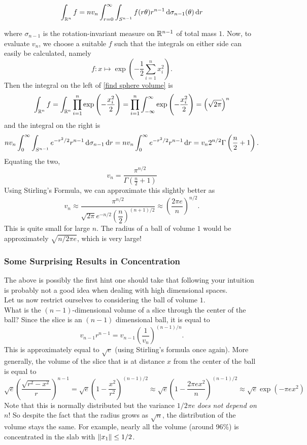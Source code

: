 \begin{equation}
\label{find sphere volume}
    \int_{\mathbb{R}^n} f = nv_n \int_{r=0}^\infty \int_{S^{n-1}} f(r\theta) r^{n-1} \operatorname{d}\!{\sigma}_{n-1}(\theta) \operatorname{d}\!{r}
\end{equation}

where $\sigma_{n-1}$ is the rotation-invariant measure on $\mathbb{R}^{n-1}$ of total mass $1$. Now, to evaluate $v_n$, we choose a suitable $f$ such that the integrals on either side can easily be calculated, namely
\[f: x\mapsto \exp\left(-\frac{1}{2}\sum_{i=1}^n x_i^2\right).\]
Then the integral on the left of \ref{find sphere volume} is
\[
\int_{\mathbb{R}^n}f = \int_{\mathbb{R}^n}\prod_{i=1}^n \exp\left(-\frac{x_i^2}{2}\right) = \prod_{i=1}^n \int_{-\infty}^\infty \exp\left(-\frac{x_i^2}{2}\right) = \left(\sqrt{2\pi}\right)^n
\]
and the integral on the right is
\[
nv_n\int_0^\infty \int_{S^{n-1}} e^{-r^2/2}r^{n-1}\operatorname{d}\!{\sigma}_{n-1}\operatorname{d}\!{r} = nv_n\int_0^\infty e^{-r^2/2}r^{n-1}\operatorname{d}\!{r} = v_n 2^{n/2}\Gamma\left(\frac{n}{2}+1\right).
\]
Equating the two,
\[ v_n = \frac{\pi^{n/2}}{\Gamma\left(\frac{n}{2}+1\right)} \]
Using Stirling's Formula, we can approximate this slightly better as
\[ v_n \approx \dfrac{\pi^{n/2}}{\sqrt{2\pi} e^{-n/2}\left(\dfrac{n}{2}\right)^{(n+1)/2}} \approx \left(\frac{2\pi e}{n}\right)^{n/2}. \]
This is quite small for large $n$. The radius of a ball of volume $1$ would be approximately $\sqrt{n/2\pi e}$, which is very large!\\

\subsubsection{Some Surprising Results in Concentration}

The above is possibly the first hint one should take that following your intuition is probably not a good idea when dealing with high dimensional spaces.\\

Let us now restrict ourselves to considering the ball of volume $1$.\\
What is the $(n-1)$-dimensional volume of a slice through the center of the ball? Since the slice is an $(n-1)$ dimensional ball, it is equal to
\[ v_{n-1}r^{n-1} = v_{n-1}\left(\frac{1}{v_n}\right)^{(n-1)/n}. \]
This is approximately equal to $\sqrt{e}$ (using Stirling's formula once again). More generally, the volume of the slice that is at distance $x$ from the center of the ball is equal to
\[ \sqrt{e}\left(\frac{\sqrt{r^2-x^2}}{r}\right)^{n-1} =
\sqrt{e}\left(1-\frac{x^2}{r^2}\right)^{(n-1)/2} \approx
\sqrt{e}\left(1-\frac{2\pi ex^2}{n}\right)^{(n-1)/2} \approx \sqrt{e}\exp(-\pi e x^2)\]
Note that this is normally distributed but the variance $1/2\pi e$ \textit{does not depend on $n$}! So despite the fact that the radius grows as $\sqrt{n}$, the distribution of the volume stays the same. For example, nearly all the volume (around 96\%) is concentrated in the slab with $\left\lVert x_1\right\rVert\leq 1/2$.\\

